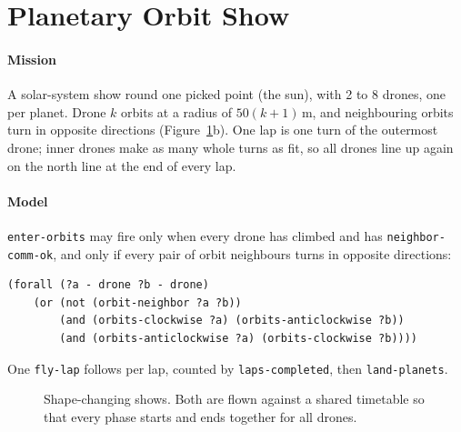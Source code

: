 \documentclass[11pt,a4paper,oneside]{report}
\newcommand{\code}[1]{\texttt{#1}}
\begin{document}
\section{Planetary Orbit Show}
\paragraph{Mission}
A solar-system show round one picked point (the sun), with 2 to 8 drones, one per planet. Drone
$k$ orbits at a radius of $50(k+1)$\,m, and neighbouring orbits turn in opposite directions
(Figure~\ref{fig:shows}b). One lap is one turn of the outermost drone; inner drones make as many
whole turns as fit, so all drones line up again on the north line at the end of every lap.

\paragraph{Model}
\code{enter-orbits} may fire only when every drone has climbed and has \code{neighbor-comm-ok},
and only if every pair of orbit neighbours turns in opposite directions:

\begin{lstlisting}
(forall (?a - drone ?b - drone)
    (or (not (orbit-neighbor ?a ?b))
        (and (orbits-clockwise ?a) (orbits-anticlockwise ?b))
        (and (orbits-anticlockwise ?a) (orbits-clockwise ?b))))
\end{lstlisting}

\noindent One \code{fly-lap} follows per lap, counted by \code{laps-completed}, then
\code{land-planets}.

\begin{figure}[H]
\centering
{}
\caption{Shape-changing shows. Both are flown against a shared timetable so that every phase
starts and ends together for all drones.}
\label{fig:shows}
\end{figure}
\end{document}
